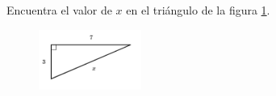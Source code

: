 \question[15]  Encuentra el valor de $x$ en el triángulo de la figura \ref{fig:lados_pitagoras_12}.
\begin{figure}[H]
    \begin{center}
        \includegraphics[width=0.3\textwidth]{../images/lados_pitagoras_12.png}
    \end{center}
    \caption{}
    \label{fig:lados_pitagoras_12}
\end{figure}